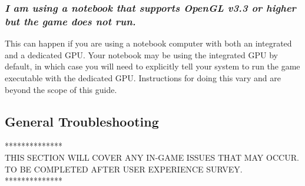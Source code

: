 \documentclass[12pt, titlepage]{article}
\begin{document}
\subsubsection{\emph{I am using a notebook that supports OpenGL v3.3 or higher but the game does not run.}}
\noindent This can happen if you are using a notebook computer with both an integrated and a dedicated GPU.  Your notebook may be using the integrated GPU by default, in which case you will need to explicitly tell your system to run the game executable with the dedicated GPU.  Instructions for doing this vary and are beyond the scope of this guide.


\subsection{General Troubleshooting}
{\center ***************\\}
\noindent THIS SECTION WILL COVER ANY IN-GAME ISSUES THAT MAY OCCUR.  TO BE COMPLETED AFTER USER EXPERIENCE SURVEY.
{\center ***************\\}
\end{document}
